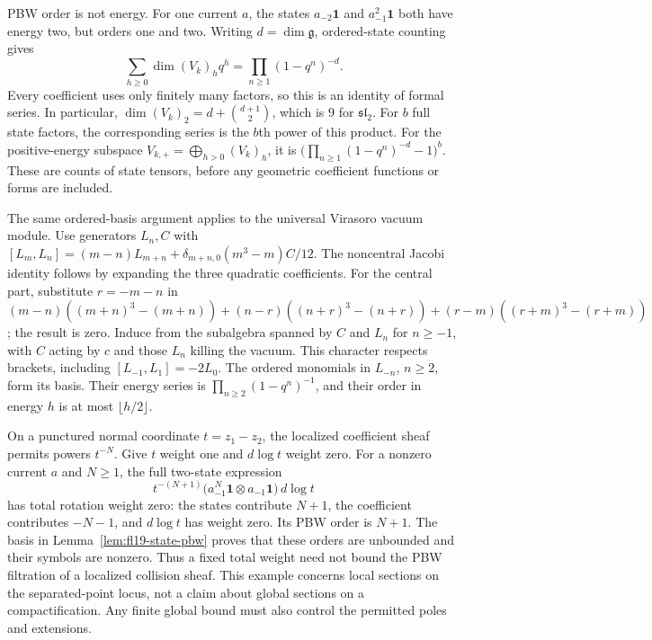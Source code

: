 PBW order is not energy.
For one current $a$, the states $a_{-2}\mathbf1$ and $a_{-1}^2\mathbf1$ both have energy two, but orders one and two.
Writing $d=\dim\mathfrak g$, ordered-state counting gives
\[
\sum_{h\ge0}\dim(V_k)_h q^h=\prod_{n\ge1}(1-q^n)^{-d}.
\]
Every coefficient uses only finitely many factors, so this is an identity of formal series.
In particular, $\dim(V_k)_2=d+\binom{d+1}{2}$, which is $9$ for $\mathfrak{sl}_2$.
For $b$ full state factors, the corresponding series is the $b$th power of this product.
For the positive-energy subspace $V_{k,+}=\bigoplus_{h>0}(V_k)_h$, it is
$\bigl(\prod_{n\ge1}(1-q^n)^{-d}-1\bigr)^b$.
These are counts of state tensors, before any geometric coefficient functions or forms are included.

The same ordered-basis argument applies to the universal Virasoro vacuum module.
Use generators $L_n,C$ with
$[L_m,L_n]=(m-n)L_{m+n}+\delta_{m+n,0}(m^3-m)C/12$.
The noncentral Jacobi identity follows by expanding the three quadratic coefficients.
For the central part, substitute $r=-m-n$ in
$(m-n)((m+n)^3-(m+n))+(n-r)((n+r)^3-(n+r))+(r-m)((r+m)^3-(r+m))$; the result is zero.
Induce from the subalgebra spanned by $C$ and $L_n$ for $n\ge-1$, with $C$ acting by $c$ and those $L_n$ killing the vacuum.
This character respects brackets, including $[L_{-1},L_1]=-2L_0$.
The ordered monomials in $L_{-n}$, $n\ge2$, form its basis.
Their energy series is $\prod_{n\ge2}(1-q^n)^{-1}$, and their order in energy $h$ is at most $\lfloor h/2\rfloor$.

\begin{example}\label{ex:fl19-poles}
On a punctured normal coordinate $t=z_1-z_2$, the localized coefficient sheaf permits powers $t^{-N}$.
Give $t$ weight one and $d\log t$ weight zero.
For a nonzero current $a$ and $N\ge1$, the full two-state expression
\[
t^{-(N+1)}
 \bigl(a_{-1}^{N}\mathbf1\otimes a_{-1}\mathbf1\bigr)\,d\log t
\]
has total rotation weight zero: the states contribute $N+1$, the coefficient contributes $-N-1$, and $d\log t$ has weight zero.
Its PBW order is $N+1$.
The basis in Lemma~\ref{lem:fl19-state-pbw} proves that these orders are unbounded and their symbols are nonzero.
Thus a fixed total weight need not bound the PBW filtration of a localized collision sheaf.
This example concerns local sections on the separated-point locus, not a claim about global sections on a compactification.
Any finite global bound must also control the permitted poles and extensions.
\end{example}

